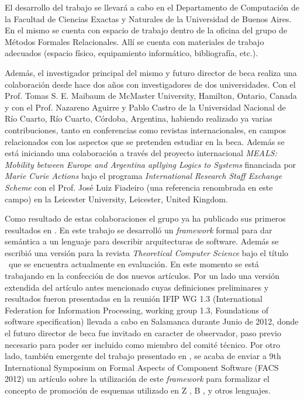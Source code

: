 \documentclass[a4paper, 11pt]{article}
\begin{document}
El desarrollo del trabajo se llevará a cabo en el Departamento de Computación de la Facultad de Ciencias Exactas y Naturales de la Universidad de Buenos Aires. En el mismo se cuenta con espacio de trabajo dentro de la oficina del grupo de Métodos Formales Relacionales. Allí se cuenta con materiales de trabajo adecuados (espacio físico, equipamiento informático, bibliografía, etc.).

Además, el investigador principal del mismo y futuro director de beca realiza una colaboración desde hace dos años con investigadores de dos universidades. Con el Prof. Tomas S. E. Maibaum de McMaster University, Hamilton, Ontario, Canada y con el Prof. Nazareno Aguirre y Pablo Castro de la Universidad Nacional de Río Cuarto, Río Cuarto, Córdoba, Argentina, habiendo realizado ya varias contribuciones, tanto en conferencias como revistas internacionales, en campos relacionados con los aspectos que se pretenden estudiar en la beca. Además se está iniciando una colaboración a través del proyecto internacional \emph{MEALS: Mobility between Europe and Argentina apllying Logics to Systems} financiada por \emph{Marie Curie Actions} bajo el programa \emph{International Research Staff Exchange Scheme} con el Prof. José Luiz Fiadeiro (una referencia renombrada en este campo) en la Leicester University, Leicester, United Kingdom.

Como resultado de estas colaboraciones el grupo ya ha publicado sus primeros resultados en \cite{castro:ictac10}. En este trabajo se desarrolló un \emph{framework} formal para dar semántica a un lenguaje para describir arquitecturas de software. Además se escribió una versión para la revista \emph{Theoretical Computer Science} bajo el título \paperola\ que se encuentra actualmente en evaluación. En este momento se está trabajando en la confección de dos nuevos artículos. Por un lado una versión extendida del artículo antes mencionado cuyas definiciones preliminares y resultados fueron presentadas en la reunión IFIP WG 1.3 (International Federation for Information Processing, working group 1.3, Foundations of software specification) llevada a cabo en Salamanca durante Junio de 2012, donde el futuro director de beca fue invitado en caracter de observador, paso previo necesario para poder ser incluido como miembro del comité técnico. Por otro lado, también emergente del trabajo presentado en \cite{castro:ictac10}, se acaba de enviar a 9th International Symposium on Formal Aspects of Component Software (FACS 2012) un artículo sobre la utilización de este \emph{framework} para formalizar el concepto de promoción de esquemas utilizado en Z \cite{spivey88}, B \cite{abrial96}, y otros lenguajes.
\end{document}
